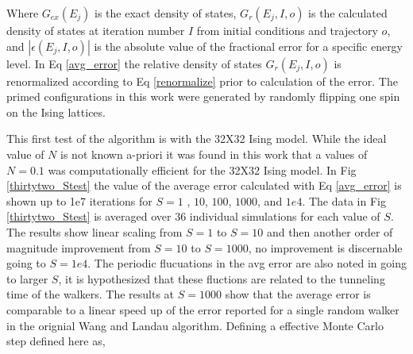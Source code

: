 \documentclass[aps,prl,reprint,superscriptaddress,showkeys]{revtex4-1}
\begin{document}
Where $G_{ex}(E_j)$ is the exact density of states, $G_{r}(E_j,I,o)$ is the calculated density of states  at iteration number $I$ from initial conditions and trajectory $o$, and $|\epsilon(E_j,I,o)|$ is the absolute value of the fractional error for a specific energy level. In Eq \ref{avg_error} the relative density of states $G_{r}(E_j,I,o)$ is renormalized according to Eq \ref{renormalize} prior to calculation of the error.  The primed configurations in this work were generated by randomly flipping one spin on the Ising lattices. 

This first test of the algorithm is with the 32X32 Ising model. While the ideal value of $N$ is not known a-priori it was found in this work that a values of $N=0.1$ was computationally efficient for the 32X32 Ising model. In Fig \ref{thirtytwo_Stest} the value of the average error calculated with Eq \ref{avg_error} is shown up to 1e7 iterations for $S=1$ , $10$, $100$, $1000$, and $1e4$. The data in Fig \ref{thirtytwo_Stest} is averaged over 36 individual simulations for each value of $S$. The results show linear scaling from $S=1$ to $S=10$ and then another order of magnitude improvement from $S=10$ to $S=1000$, no improvement is discernable going to $S=1e4$.  The periodic flucuations in the avg error are also noted in going to larger $S$, it is hypothesized that these fluctions are related to the tunneling time of the walkers. The results at $S=1000$ show that the average error is comparable to a linear speed up of the error reported for a single random walker in the orignial Wang and Landau algorithm. Defining a effective Monte Carlo step defined here as,
\end{document}
